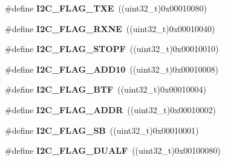 \begin{DoxyCompactItemize}
\item 
\#define {\bfseries I2\+C\+\_\+\+F\+L\+A\+G\+\_\+\+T\+XE}~((uint32\+\_\+t)0x00010080)\hypertarget{group___i2_c___flag__definition_gaeda14a3e9d02ff20a0d001bba9328f3d}{}\label{group___i2_c___flag__definition_gaeda14a3e9d02ff20a0d001bba9328f3d}

\item 
\#define {\bfseries I2\+C\+\_\+\+F\+L\+A\+G\+\_\+\+R\+X\+NE}~((uint32\+\_\+t)0x00010040)\hypertarget{group___i2_c___flag__definition_gad53c5b70a186f699f187c7a641ab0dac}{}\label{group___i2_c___flag__definition_gad53c5b70a186f699f187c7a641ab0dac}

\item 
\#define {\bfseries I2\+C\+\_\+\+F\+L\+A\+G\+\_\+\+S\+T\+O\+PF}~((uint32\+\_\+t)0x00010010)\hypertarget{group___i2_c___flag__definition_gacc7d993963e199a6ddba391dab8da896}{}\label{group___i2_c___flag__definition_gacc7d993963e199a6ddba391dab8da896}

\item 
\#define {\bfseries I2\+C\+\_\+\+F\+L\+A\+G\+\_\+\+A\+D\+D10}~((uint32\+\_\+t)0x00010008)\hypertarget{group___i2_c___flag__definition_ga316c78cbf34b74da96d69f702a0d1444}{}\label{group___i2_c___flag__definition_ga316c78cbf34b74da96d69f702a0d1444}

\item 
\#define {\bfseries I2\+C\+\_\+\+F\+L\+A\+G\+\_\+\+B\+TF}~((uint32\+\_\+t)0x00010004)\hypertarget{group___i2_c___flag__definition_ga4dc3d44342007a5cd21c3baa0d938606}{}\label{group___i2_c___flag__definition_ga4dc3d44342007a5cd21c3baa0d938606}

\item 
\#define {\bfseries I2\+C\+\_\+\+F\+L\+A\+G\+\_\+\+A\+D\+DR}~((uint32\+\_\+t)0x00010002)\hypertarget{group___i2_c___flag__definition_ga5472d1196e934e0cc471aba8f66af416}{}\label{group___i2_c___flag__definition_ga5472d1196e934e0cc471aba8f66af416}

\item 
\#define {\bfseries I2\+C\+\_\+\+F\+L\+A\+G\+\_\+\+SB}~((uint32\+\_\+t)0x00010001)\hypertarget{group___i2_c___flag__definition_gae009ab84be03fcc438625b1c39376ad4}{}\label{group___i2_c___flag__definition_gae009ab84be03fcc438625b1c39376ad4}

\item 
\#define {\bfseries I2\+C\+\_\+\+F\+L\+A\+G\+\_\+\+D\+U\+A\+LF}~((uint32\+\_\+t)0x00100080)\hypertarget{group___i2_c___flag__definition_ga3755b783aa73568659478c2e2e45e27f}{}\label{group___i2_c___flag__definition_ga3755b783aa73568659478c2e2e45e27f}


\end{DoxyCompactItemize}
